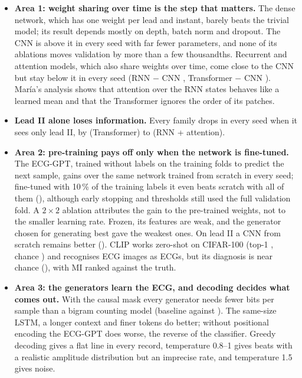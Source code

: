 \begin{itemize}[leftmargin=1.2em,itemsep=1pt,topsep=2pt]
  \item \textbf{Area 1: weight sharing over time is the step that matters.} The dense network, which has
        one weight per lead and instant, barely beats the trivial model; its result depends mostly on
        depth, batch norm and dropout. The CNN is \cnnDiffDenseMean{} above it in every seed with far fewer
        parameters, and none of its ablations moves validation by more than a few thousandths. Recurrent
        and attention models, which also share weights over time, come close to the CNN but stay below it
        in every seed (RNN $-$ CNN \rnnDiffCnnMean{}, Transformer $-$ CNN \transformerDiffCnnMean{}).
        Mar\'ia's analysis shows that attention over the RNN states behaves like a learned mean and that
        the Transformer ignores the order of its patches.
  \item \textbf{Lead II alone loses information.} Every family drops in every seed when it sees only
        lead II, by \leadsTestDiffMeanTransformer{} (Transformer) to \leadsTestDiffMeanRnnattn{}
        (RNN + attention).
  \item \textbf{Area 2: pre-training pays off only when the network is fine-tuned.} The ECG-GPT, trained
        without labels on the training folds to predict the next sample, gains over the same network
        trained from scratch in every seed; fine-tuned with 10\,\% of the training labels it even beats
        scratch with all of them (\transferTestDiffMeanFinetuneFOneZeroVsScratchFOneZeroZero{}), although
        early stopping and thresholds still used the full validation fold. A $2\times2$ ablation
        attributes the gain to the pre-trained weights, not to the smaller learning rate. Frozen, its
        features are weak, and the generator chosen for generating best gave the weakest ones. On lead II
        a CNN from scratch remains better (\comparisonTestDiffMeanFinetuneFOneZeroZeroVsOneleadCnn{}).
        CLIP works zero-shot on CIFAR-100 (top-1 \zeroshotCifarTopOneNotebook{}, chance
        \zeroshotCifarChanceTopOne{}) and recognises ECG images as ECGs, but its diagnosis is near chance
        (\zeroshotTestMacroAuroc{}), with MI ranked against the truth.
  \item \textbf{Area 3: the generators learn the ECG, and decoding decides what comes out.} With the
        causal mask every generator needs fewer bits per sample than a bigram counting model (baseline
        \generativeBitsMeanBase{} against \generativeBigramBitsVTwoFiveSix{}). The same-size LSTM, a
        longer context and finer tokens do better; without positional encoding the ECG-GPT does worse,
        the reverse of the classifier. Greedy decoding gives a flat line in every record, temperature
        0.8--1 gives beats with a realistic amplitude distribution but an imprecise rate, and
        temperature 1.5 gives noise.
\end{itemize}

